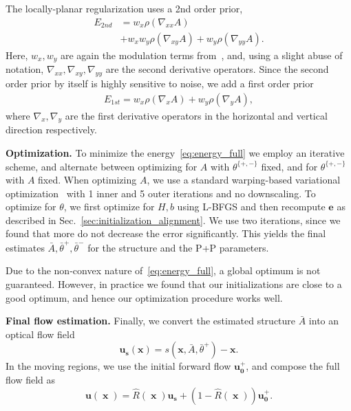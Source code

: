 \documentclass[10pt,twocolumn,letterpaper]{article}
\DeclareMathOperator{\x}{\mathbf{x}}
\begin{document}
The locally-planar regularization uses a 2nd order prior,
\begin{align}
E_{2nd} &= 
		w_x \rho \left( \nabla_{xx} A \right) \nonumber \\
&+
		w_x w_y \rho \left( \nabla_{xy} A \right)
		+
		w_y \rho \left( \nabla_{yy} A \right).
\end{align}
Here, $w_x, w_y$ are again the modulation terms from~\cite{Rother:Grabcut}, and, using a slight abuse of notation, $\nabla_{xx}, \nabla_{xy}, \nabla_{yy}$ are the second derivative operators.
Since the second order prior by itself is highly sensitive to noise, we add a first order prior
\begin{align}
E_{1st} = w_x \rho \left( \nabla_x A \right)
		+
		w_y \rho \left( \nabla_y A \right),
\end{align}
where $\nabla_x, \nabla_y$ are the first derivative operators in the
horizontal and vertical direction respectively.

{\bf Optimization.}
To minimize the energy~\eqref{eq:energy_full} we employ an iterative scheme, and alternate between optimizing for $A$ with $\theta^{ \{+,-\} }$ fixed, and for $\theta^{ \{+,-\} }$ with $A$ fixed.
When optimizing $A$, we use a standard warping-based variational optimization~\cite{Brox:TheoryOfWarping} with 1 inner and 5 outer iterations and no downscaling.
To optimize for $\theta$, we first optimize for $H, b$ using L-BFGS and then recompute $\mathbf{e}$ as described in Sec.~\ref{sec:initialization_alignment}.
We use two iterations, since we found that more do not decrease the error significantly.
This yields the final estimates $\bar{A}, \bar{\theta}^+, \bar{\theta}^-$ for the structure and the P+P parameters.

Due to the non-convex nature of~\eqref{eq:energy_full}, a global optimum is not guaranteed.
However, in practice we found that our initializations are close to a good optimum, and hence our optimization procedure works well.

{\bf Final flow estimation.}
Finally, we convert the estimated structure $\bar{A}$ into an optical flow field
\begin{equation}
\mathbf{u_s}(\mathbf{x}) = s \left(\mathbf{x}, \bar{A}, \bar{\theta}^+ \right) - \mathbf{x}.
\end{equation}
In the moving regions, we use the initial forward flow $\mathbf{u_0^+}$, and compose the full flow field as
\begin{equation}
\mathbf{u} \left( \x \right) = \hat{R}(\x) \mathbf{u_s} + \left( 1 - \hat{R}(\x) \right) \mathbf{u_0^+}.
\end{equation}
\end{document}
